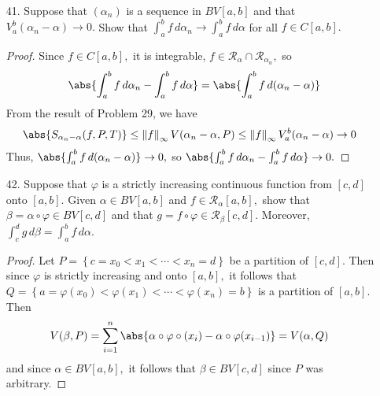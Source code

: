 \documentclass{article}
\begin{document}
\begin{itemize}
	\item[41.] Suppose that $(\alpha_n)$ is a sequence in $BV[a, b]$ and that $V_a^b(\alpha_n-\alpha)\to 0.$ Show that $\int_a^b f\, d\alpha_n\to\int_a^b f\, d\alpha$ for all $f\in C[a, b].$
		\begin{proof}
			Since $f\in C[a, b],$ it is integrable, $f\in \mathcal R_\alpha\cap \mathcal R_{\alpha_n},$ so
			\begin{align*}
				\abs{\int_a^b f\, d\alpha_n - \int_a^b f\, d\alpha} = \abs{\int_a^b f\, d(\alpha_n-\alpha)} 
			\end{align*}
			From the result of Problem 29, we have
			\begin{align*}
				\abs{S_{\alpha_n-\alpha}(f, P, T)} &\le \left\lVert f \right\rVert_\infty V(\alpha_n-\alpha, P)\le \left\lVert f \right\rVert_\infty V_a^b (\alpha_n-\alpha) \to 0
			\end{align*}
			Thus, $\abs{\int_a^b f\, d(\alpha_n-\alpha)}\to 0,$ so $\abs{\int_a^b f\, d\alpha_n-\int_a^b f\, d\alpha} \to 0.$
		\end{proof}

	\item[42.] Suppose that $\varphi$ is a strictly increasing continuous function from $[c, d]$ onto $[a, b].$ Given $\alpha\in BV[a, b]$ and $f\in \mathcal R_\alpha[a, b],$ show that $\beta=\alpha\circ\varphi\in BV[c, d]$ and that $g=f\circ \varphi\in \mathcal R_\beta[c, d].$ Moreover, $\int_c^d g\, d\beta=\int_a^b f\, d\alpha.$
		\begin{proof}
			Let $P=\left\{ c=x_0<x_1<\cdots<x_n=d \right\}$ be a partition of $[c, d].$ Then since $\varphi$ is strictly increasing and onto $[a, b],$ it follows that $Q=\left\{ a=\varphi(x_0)<\varphi(x_1)<\cdots<\varphi(x_n)=b \right\}$ is a partition of $[a, b].$ Then
			\begin{align*}
				V(\beta, P) &= \sum_{i=1}^{n} \abs{\alpha\circ\varphi\circ(x_i)-\alpha\circ\varphi(x_{i-1})} = V(\alpha, Q)
			\end{align*}
			and since $\alpha\in BV[a, b],$ it follows that $\beta\in BV[c, d]$ since $P$ was arbitrary.


\end{proof}
\end{itemize}
\end{document}
